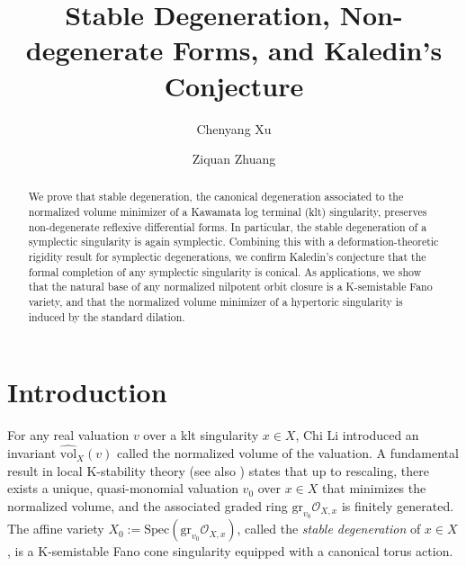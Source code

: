 \documentclass[12pt]{amsart}
\theoremstyle{definition}
\newcommand{\cO}{\mathcal{O}}
\numberwithin{equation}{section}
\begin{document}
\title[Stable degeneration and Kaledin's Conjecture]{Stable Degeneration, Non-degenerate Forms, and Kaledin's Conjecture}


\date{}

\author{Chenyang Xu}
\author{Ziquan Zhuang}





\address{Department of Mathematics, Princeton University, Princeton, NJ 08544, USA}


\address{Department of Mathematics, Johns Hopkins University, Baltimore, MD 21218, USA}


\address{Univ. Bordeaux, CNRS, Bordeaux INP, IMB, UMR 5251, F-33400 Talence, France}



\begin{abstract}
We prove that stable degeneration, the canonical degeneration associated to the normalized volume minimizer of a Kawamata log terminal (klt) singularity, preserves non-degenerate reflexive differential forms. In particular, the stable degeneration of a symplectic singularity is again symplectic. Combining this with a deformation-theoretic rigidity result for symplectic degenerations, we confirm Kaledin's conjecture that the formal completion of any symplectic singularity is conical. As applications, we show that the natural base of any normalized nilpotent orbit closure is a K-semistable Fano variety, and that the normalized volume minimizer of a hypertoric singularity is induced by the standard dilation. 
\end{abstract}

\maketitle

\section{Introduction}

For any real valuation $v$ over a klt singularity $x \in X$, Chi Li \cite{Li-nv} introduced an invariant $\widehat{\mathrm{vol}}_X(v)$ called the normalized volume of the valuation. A fundamental result in local K-stability theory \cite{Blu-existence, LX-higher-rank, Xu-quasimonomial, XZ-uniqueness, XZ-SDC} (see also \cite{Z-survey-klt-stab}) states that up to rescaling, there exists a unique, quasi-monomial valuation $v_0$ over $x\in X$ that minimizes the normalized volume, and the associated graded ring $\mathrm{gr}_{v_0} \cO_{X,x}$ is finitely generated. The affine variety $X_0 := \mathrm{Spec}(\mathrm{gr}_{v_0} \cO_{X,x})$, called the \emph{stable degeneration} of $x \in X$, is a K-semistable Fano cone singularity equipped with a canonical torus action.
\end{document}
